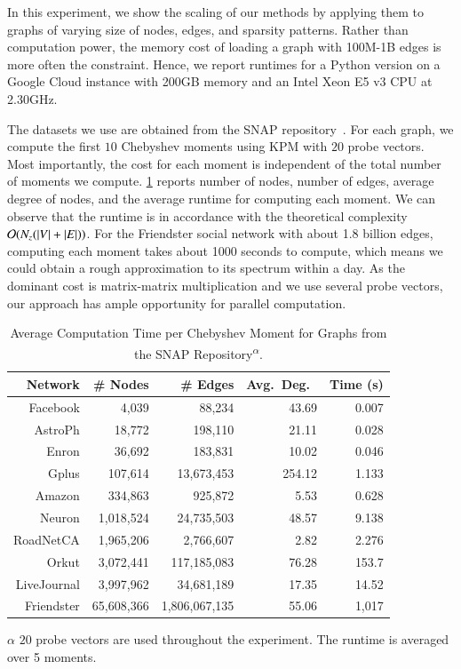 In this experiment, we show the scaling of our methods by applying them to
graphs of varying size of nodes, edges, and sparsity patterns. Rather than
computation power, the memory cost of loading a graph with 100M-1B edges is more
often the constraint. Hence, we report runtimes for a Python version on a Google
Cloud instance with 200GB memory and an Intel Xeon E5 v3 CPU at 2.30GHz.

The datasets we use are obtained from the SNAP repository~\cite{snapnets}. For
each graph, we compute the first $10$ Chebyshev moments using KPM with $20$
probe vectors. Most importantly, the cost for each moment is independent of the
total number of moments we compute. \cref{tab:scaling} reports number of
nodes, number of edges, average degree of nodes, and the average runtime for
computing each moment. We can observe that the runtime is in accordance with
the theoretical complexity $\mathcal{O}(N_z(\left\lvert V\right\rvert + \left\lvert E\right\rvert))$. For the Friendster
social network with about 1.8 billion edges, computing each moment takes about
1000 seconds to compute, which means we could obtain a rough approximation to
its spectrum within a day. As the dominant cost is matrix-matrix multiplication
and we use several probe vectors, our approach has ample opportunity for
parallel computation.
\begin{table}[ht]
  \begin{center}
  \captionsetup{width=.8\textwidth}
  \caption{Average Computation Time per Chebyshev Moment for Graphs from the
  SNAP Repository\textsuperscript{$\alpha$}.}\label{tab:scaling}
  \begin{threeparttable}
    \begin{tabular}{r r r r r}
      \toprule
      Network & \# Nodes &\# Edges & Avg.\ Deg.\ & Time (s) \\ \midrule
      Facebook & 4,039 & 88,234 & 43.69 & 0.007\\
      AstroPh & 18,772 & 198,110 & 21.11 & 0.028\\
      Enron & 36,692 & 183,831 & 10.02 & 0.046\\
      Gplus & 107,614 & 13,673,453 & 254.12 & 1.133\\
      Amazon & 334,863 & 925,872 & 5.53 & 0.628\\
      Neuron & 1,018,524 & 24,735,503 & 48.57 & 9.138\\
      RoadNetCA & 1,965,206 & 2,766,607 & 2.82 & 2.276\\
      Orkut & 3,072,441 & 117,185,083 & 76.28 & 153.7\\
      LiveJournal & 3,997,962 & 34,681,189 & 17.35 & 14.52 \\
      Friendster & 65,608,366 & 1,806,067,135 & 55.06 & 1,017\\
      \bottomrule
    \end{tabular}
    \begin{tablenotes}
      \item[$\alpha$]$20$ probe vectors are used throughout the experiment. The
      runtime is averaged over 5 moments.
    \end{tablenotes}
  \end{threeparttable}
  \end{center}
\end{table}

